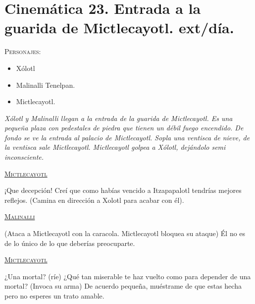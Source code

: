 \documentclass[11pt,letterpaper]{article}
\begin{document}
\section{Cinemática 23. Entrada a la guarida de Mictlecayotl. ext/día.}
 \textsc{Personajes}:
 \begin{itemize}
 \item Xólotl
 \item Malinalli Tenelpan.
 \item Mictlecayotl.
 \end{itemize}
\textit{Xólotl y Malinalli llegan a la entrada de la guarida de Mictlecayotl. Es una pequeña plaza con pedestales de piedra que tienen un débil fuego encendido. De fondo se ve la entrada al palacio de Mictlecayotl. Sopla una ventisca de nieve, de la ventisca sale Mictlecayotl. Mictlecayotl golpea a Xólotl, dejándolo semi inconsciente.}
\begin{center}
\textsc{\underline{Mictlecayotl}}
\\
\par
¡Que decepción! Creí que como habías vencido a Itzapapalotl tendrías mejores reflejos. (Camina en dirección a Xolotl para acabar con él).
\\
\par
\textsc{\underline{Malinalli}}
\\
\par
(Ataca a Mictlecayotl con la caracola. Mictlecayotl bloquea su ataque) Él no es de lo único de lo que deberías preocuparte.
\\
\par
\textsc{\underline{Mictlecayotl}}
\\
\par
¿Una mortal? (ríe) ¿Qué tan miserable te haz vuelto como para depender de una mortal? (Invoca su arma) De acuerdo pequeña, muéstrame de que estas hecha pero no esperes un trato amable.
\end{center}
\end{document}
